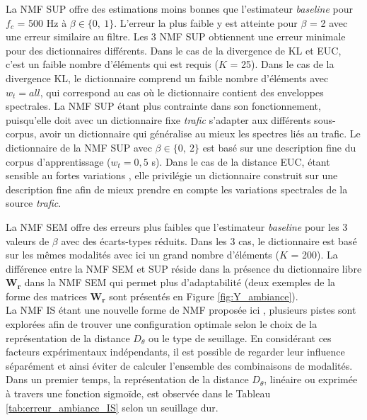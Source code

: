 La NMF SUP offre des estimations moins bonnes que l'estimateur \textit{baseline} pour $f_c$ = 500 Hz à  $\beta \in \lbrace 0,~1 \rbrace$. L'erreur la plus faible y est atteinte pour $\beta$ = 2 avec une erreur similaire au filtre.
Les 3 NMF SUP obtiennent une erreur minimale pour des dictionnaires différents. Dans le cas de la divergence de KL et EUC, c'est un faible nombre d'éléments qui est requis ($K$ = 25). Dans le cas de la divergence KL, le dictionnaire comprend un faible nombre d'éléments avec $w_t = all$, qui correspond au cas où le dictionnaire contient des enveloppes spectrales. La NMF SUP étant plus contrainte dans son fonctionnement, puisqu'elle doit avec un dictionnaire fixe \textit{trafic} s'adapter aux différents sous-corpus, avoir un dictionnaire qui généralise au mieux les spectres liés au trafic. Le dictionnaire de la NMF SUP avec $\beta \in \lbrace 0,~2 \rbrace$ est basé sur une description fine du corpus d'apprentissage ($w_t = 0,5$ s). Dans le cas de la distance EUC, étant sensible au fortes variations , elle privilégie un dictionnaire construit sur une description fine afin de mieux prendre en compte les variations spectrales de la source \textit{trafic}.

La NMF SEM offre des erreurs plus faibles que l'estimateur \textit{baseline} pour les 3 valeurs de $\beta$ avec des écarts-types réduits. Dans les 3 cas, le dictionnaire est basé sur les mêmes modalités avec ici un grand nombre d'éléments ($K$ = 200).
La différence entre la NMF SEM et SUP réside dans la présence du dictionnaire libre $\mathbf{W_r}$ dans la NMF SEM qui permet plus d'adaptabilité (deux exemples de la forme des matrices $\mathbf{W_r}$ sont présentés en Figure \ref{fig:Y_ambiance}).\\

La NMF IS étant une nouvelle forme de NMF proposée ici , plusieurs pistes sont explorées afin de trouver une configuration optimale selon le choix de la représentation de la distance $D_{\theta}$ ou le type de seuillage. En considérant ces facteurs expérimentaux indépendants, il est possible de regarder leur influence séparément et ainsi éviter de calculer l'ensemble des combinaisons de modalités. Dans un premier temps, la représentation de la distance $D_{\theta}$, linéaire ou exprimée à travers une fonction sigmoïde, est observée dans le Tableau \ref{tab:erreur_ambiance_IS} selon un seuillage dur.

